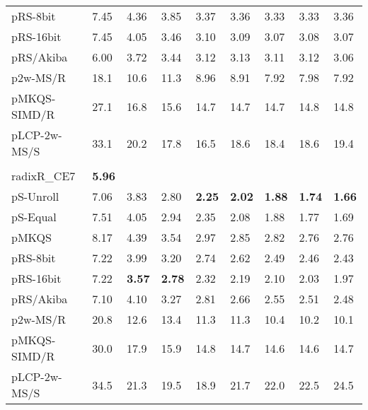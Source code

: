 \documentclass[a4paper]{myjournal}
\begin{document}
\begin{table}
\begin{tabularx}{\linewidth}{l|*{8}{>{\hfill}X}|@{}}
     pRS-8bit &     7.45 &     4.36 &     3.85 &     3.37 &     3.36 &     3.33 &     3.33 &     3.36 \\
    pRS-16bit &     7.45 &     4.05 &     3.46 &     3.10 &     3.09 &     3.07 &     3.08 &     3.07 \\
    pRS/Akiba &     6.00 &     3.72 &     3.44 &     3.12 &     3.13 &     3.11 &     3.12 &     3.06 \\
     p2w-MS/R &     18.1 &     10.6 &     11.3 &     8.96 &     8.91 &     7.92 &     7.98 &     7.92 \\
 pMKQS-SIMD/R &     27.1 &     16.8 &     15.6 &     14.7 &     14.7 &     14.7 &     14.8 &     14.8 \\
 pLCP-2w-MS/S &     33.1 &     20.2 &     17.8 &     16.5 &     18.6 &     18.4 &     18.6 &     19.4 \\ \hline
& \multicolumn{8}{l|}{\textbf{Sinha NoDup} (complete), , , } \\ \cline{2-9}
radixR\_CE7 & \bf 5.96 &  &  &  &  &  &  &  \\
pS-Unroll & 7.06 &     3.83 &     2.80 & \bf 2.25 & \bf 2.02 & \bf 1.88 & \bf 1.74 & \bf 1.66 \\
 pS-Equal & 7.51 &     4.05 &     2.94 &     2.35 &     2.08 &     1.88 &     1.77 &     1.69 \\
        pMKQS & 8.17 &     4.39 &     3.54 &     2.97 &     2.85 &     2.82 &     2.76 &     2.76 \\
     pRS-8bit & 7.22 &     3.99 &     3.20 &     2.74 &     2.62 &     2.49 &     2.46 &     2.43 \\
    pRS-16bit & 7.22 & \bf 3.57 & \bf 2.78 &     2.32 &     2.19 &     2.10 &     2.03 &     1.97 \\
    pRS/Akiba & 7.10 &     4.10 &     3.27 &     2.81 &     2.66 &     2.55 &     2.51 &     2.48 \\
     p2w-MS/R & 20.8 &     12.6 &     13.4 &     11.3 &     11.3 &     10.4 &     10.2 &     10.1 \\
 pMKQS-SIMD/R & 30.0 &     17.9 &     15.9 &     14.8 &     14.7 &     14.6 &     14.6 &     14.7 \\
 pLCP-2w-MS/S & 34.5 &     21.3 &     19.5 &     18.9 &     21.7 &     22.0 &     22.5 &     24.5 \\ \hline
\end{tabularx}
\end{table}
\end{document}
